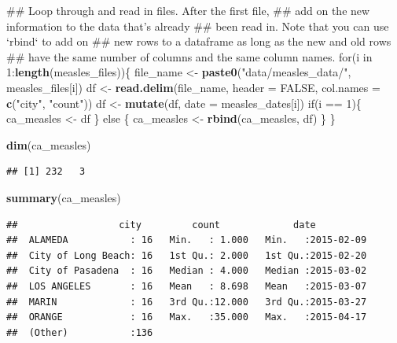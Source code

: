 \documentclass[]{book}
\makeatletter
\newenvironment{Shaded}{\begin{snugshade}}{\end{snugshade}}
\newcommand{\KeywordTok}[1]{\textcolor[rgb]{0.13,0.29,0.53}{\textbf{{#1}}}}
\newcommand{\DataTypeTok}[1]{\textcolor[rgb]{0.13,0.29,0.53}{{#1}}}
\newcommand{\DecValTok}[1]{\textcolor[rgb]{0.00,0.00,0.81}{{#1}}}
\newcommand{\StringTok}[1]{\textcolor[rgb]{0.31,0.60,0.02}{{#1}}}
\newcommand{\OtherTok}[1]{\textcolor[rgb]{0.56,0.35,0.01}{{#1}}}
\newcommand{\NormalTok}[1]{{#1}}
\newenvironment{kframe}{%
\medskip{}
\setlength{\fboxsep}{.8em}
 \def\at@end@of@kframe{}%
 \ifinner\ifhmode%
  \def\at@end@of@kframe{\end{minipage}}%
  \begin{minipage}{\columnwidth}%
 \fi\fi%
 \def\FrameCommand##1{\hskip\@totalleftmargin \hskip-\fboxsep
 \colorbox{shadecolor}{##1}\hskip-\fboxsep
     \hskip-\linewidth \hskip-\@totalleftmargin \hskip\columnwidth}%
 \MakeFramed {\advance\hsize-\width
   \@totalleftmargin\z@ \linewidth\hsize
   \@setminipage}}%
 {\par\unskip\endMakeFramed%
 \at@end@of@kframe}
\renewenvironment{Shaded}{\begin{kframe}}{\end{kframe}}
\makeatother
\begin{document}
\begin{Shaded}
\begin{Highlighting}[]
\NormalTok{## Loop through and read in files. After the first file,}
\NormalTok{## add on the new information to the data that's already }
\NormalTok{## been read in. Note that you can use `rbind` to add on }
\NormalTok{## new rows to a dataframe as long as the new and old rows}
\NormalTok{## have the same number of columns and the same column names.}
\NormalTok{for(i in }\DecValTok{1}\NormalTok{:}\KeywordTok{length}\NormalTok{(measles_files))\{}
        \NormalTok{file_name <-}\StringTok{ }\KeywordTok{paste0}\NormalTok{(}\StringTok{"data/measles_data/"}\NormalTok{, measles_files[i])}
        \NormalTok{df <-}\StringTok{ }\KeywordTok{read.delim}\NormalTok{(file_name, }\DataTypeTok{header =} \OtherTok{FALSE}\NormalTok{, }
                         \DataTypeTok{col.names =} \KeywordTok{c}\NormalTok{(}\StringTok{"city"}\NormalTok{, }\StringTok{"count"}\NormalTok{))}
        \NormalTok{df <-}\StringTok{ }\KeywordTok{mutate}\NormalTok{(df, }\DataTypeTok{date =} \NormalTok{measles_dates[i])}
        \NormalTok{if(i ==}\StringTok{ }\DecValTok{1}\NormalTok{)\{}
                \NormalTok{ca_measles <-}\StringTok{ }\NormalTok{df}
        \NormalTok{\} else \{ }
                 \NormalTok{ca_measles <-}\StringTok{ }\KeywordTok{rbind}\NormalTok{(ca_measles, df)}
                \NormalTok{\}}
\NormalTok{\}}

\KeywordTok{dim}\NormalTok{(ca_measles)}
\end{Highlighting}
\end{Shaded}

\begin{verbatim}
## [1] 232   3
\end{verbatim}

\begin{Shaded}
\begin{Highlighting}[]
\KeywordTok{summary}\NormalTok{(ca_measles)}
\end{Highlighting}
\end{Shaded}

\begin{verbatim}
##                  city         count             date           
##  ALAMEDA           : 16   Min.   : 1.000   Min.   :2015-02-09  
##  City of Long Beach: 16   1st Qu.: 2.000   1st Qu.:2015-02-20  
##  City of Pasadena  : 16   Median : 4.000   Median :2015-03-02  
##  LOS ANGELES       : 16   Mean   : 8.698   Mean   :2015-03-07  
##  MARIN             : 16   3rd Qu.:12.000   3rd Qu.:2015-03-27  
##  ORANGE            : 16   Max.   :35.000   Max.   :2015-04-17  
##  (Other)           :136
\end{verbatim}
\end{document}
